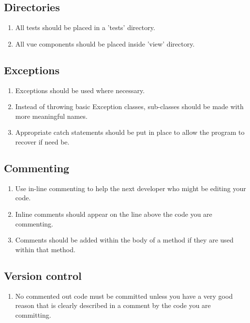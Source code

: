 \documentclass{article}
\begin{document}
            \subsection{Directories}
                \begin{enumerate}
                    \item All tests should be placed in a 'tests' directory.
                    \item All vue components should be placed inside 'view' directory.
                \end{enumerate}
                
            \subsection{Exceptions}
                \begin{enumerate}
                    \item Exceptions should be used where necessary.
                    \item Instead of throwing basic Exception classes, sub-classes should be made with more meaningful names.
                    \item Appropriate catch statements should be put in place to allow the program to recover if need be.
                \end{enumerate}
            \subsection{Commenting}
                \begin{enumerate}
                    \item Use in-line commenting to help the next developer who might be editing your code.
                    \item Inline comments should appear on the line above the code you are commenting.
                    \item Comments should be added within the body of a method if they are used within that method.
                \end{enumerate}
            \subsection{Version control}
                \begin{enumerate}
                    \item No commented out code must be committed unless you have a very good reason that is clearly
described in a comment by the code you are committing.
                \end{enumerate}
                
\end{document}
